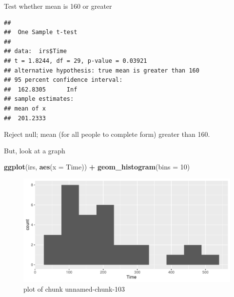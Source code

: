 \documentclass[ignorenonframetext,]{beamer}
\newenvironment{Shaded}{\begin{snugshade}}{\end{snugshade}}
\newcommand{\DataTypeTok}[1]{\textcolor[rgb]{0.13,0.29,0.53}{#1}}
\newcommand{\DecValTok}[1]{\textcolor[rgb]{0.00,0.00,0.81}{#1}}
\newcommand{\KeywordTok}[1]{\textcolor[rgb]{0.13,0.29,0.53}{\textbf{#1}}}
\newcommand{\NormalTok}[1]{#1}
\newcommand{\OperatorTok}[1]{\textcolor[rgb]{0.81,0.36,0.00}{\textbf{#1}}}
\newcommand{\StringTok}[1]{\textcolor[rgb]{0.31,0.60,0.02}{#1}}
\begin{document}
\begin{frame}[fragile]{Test whether mean is 160 or greater}
\protect\hypertarget{test-whether-mean-is-160-or-greater}{}

\begin{Shaded}
\end{Shaded}

\begin{verbatim}
## 
##  One Sample t-test
## 
## data:  irs$Time
## t = 1.8244, df = 29, p-value = 0.03921
## alternative hypothesis: true mean is greater than 160
## 95 percent confidence interval:
##  162.8305      Inf
## sample estimates:
## mean of x 
##  201.2333
\end{verbatim}

Reject null; mean (for all people to complete form) greater than 160.

\end{frame}

\begin{frame}[fragile]{But, look at a graph}
\protect\hypertarget{but-look-at-a-graph}{}

\begin{Shaded}
\begin{Highlighting}[]
\KeywordTok{ggplot}\NormalTok{(irs, }\KeywordTok{aes}\NormalTok{(}\DataTypeTok{x =}\NormalTok{ Time)) }\OperatorTok{+}\StringTok{ }\KeywordTok{geom_histogram}\NormalTok{(}\DataTypeTok{bins =} \DecValTok{10}\NormalTok{)}
\end{Highlighting}
\end{Shaded}

\begin{figure}
\centering
\includegraphics{figure/unnamed-chunk-103-1.pdf}
\caption{plot of chunk unnamed-chunk-103}
\end{figure}

\end{frame}
\end{document}
